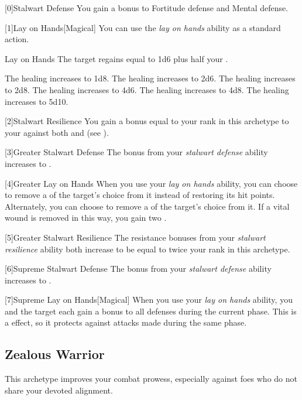         [0]{Stalwart Defense} You gain a  bonus to Fortitude defense and Mental defense.

        [1]{Lay on Hands}[Magical] You can use the \textit{lay on hands} ability as a standard action.
        \begin{freeability}{Lay on Hands}
            The target regains  equal to 1d6 plus half your .

            \rankline
             The healing increases to 1d8.
             The healing increases to 2d6.
             The healing increases to 2d8.
             The healing increases to 4d6.
             The healing increases to 4d8.
             The healing increases to 5d10.
        \end{freeability}

        [2]{Stalwart Resilience} You gain a bonus equal to your rank in this archetype to your  against both  and  (see ).

        [3]{Greater Stalwart Defense} The bonus from your \textit{stalwart defense} ability increases to .

        [4]{Greater Lay on Hands} When you use your \textit{lay on hands} ability, you can choose to remove a  of the target's choice from it instead of restoring its hit points.
        Alternately, you can choose to remove a  of the target's choice from it.
        If a vital wound is removed in this way, you gain two .

        [5]{Greater Stalwart Resilience} The resistance bonuses from your \textit{stalwart resilience} ability both increase to be equal to twice your rank in this archetype.

        [6]{Supreme Stalwart Defense} The bonus from your \textit{stalwart defense} ability increases to .

        [7]{Supreme Lay on Hands}[Magical] When you use your \textit{lay on hands} ability, you and the target each gain a  bonus to all defenses during the current phase.
        This is a  effect, so it protects against attacks made during the same phase.

    \newpage
    \subsection{Zealous Warrior}
        This archetype improves your combat prowess, especially against foes who do not share your devoted alignment.

